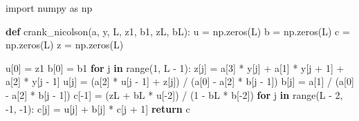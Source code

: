 \documentclass[
  letterpaper,
  DIV=11,
  numbers=noendperiod]{scrartcl}
\newenvironment{Shaded}{\begin{snugshade}}{\end{snugshade}}
\newcommand{\BuiltInTok}[1]{\textcolor[rgb]{0.00,0.23,0.31}{#1}}
\newcommand{\ControlFlowTok}[1]{\textcolor[rgb]{0.00,0.23,0.31}{\textbf{#1}}}
\newcommand{\DecValTok}[1]{\textcolor[rgb]{0.68,0.00,0.00}{#1}}
\newcommand{\ImportTok}[1]{\textcolor[rgb]{0.00,0.46,0.62}{#1}}
\newcommand{\KeywordTok}[1]{\textcolor[rgb]{0.00,0.23,0.31}{\textbf{#1}}}
\newcommand{\NormalTok}[1]{\textcolor[rgb]{0.00,0.23,0.31}{#1}}
\newcommand{\OperatorTok}[1]{\textcolor[rgb]{0.37,0.37,0.37}{#1}}
\theoremstyle{definition}
\theoremstyle{remark}
\begin{document}
\label{crank_nicolson}
\begin{Shaded}
\begin{Highlighting}[]
\ImportTok{import}\NormalTok{ numpy }\ImportTok{as}\NormalTok{ np}

\KeywordTok{def}\NormalTok{ crank\_nicolson(a, y, L, z1, b1, zL, bL):}
\NormalTok{    u }\OperatorTok{=}\NormalTok{ np.zeros(L)}
\NormalTok{    b }\OperatorTok{=}\NormalTok{ np.zeros(L)}
\NormalTok{    c }\OperatorTok{=}\NormalTok{ np.zeros(L)}
\NormalTok{    z }\OperatorTok{=}\NormalTok{ np.zeros(L)}

\NormalTok{    u[}\DecValTok{0}\NormalTok{] }\OperatorTok{=}\NormalTok{ z1}
\NormalTok{    b[}\DecValTok{0}\NormalTok{] }\OperatorTok{=}\NormalTok{ b1}
    \ControlFlowTok{for}\NormalTok{ j }\KeywordTok{in} \BuiltInTok{range}\NormalTok{(}\DecValTok{1}\NormalTok{, L }\OperatorTok{{-}} \DecValTok{1}\NormalTok{):}
\NormalTok{        z[j] }\OperatorTok{=}\NormalTok{ a[}\DecValTok{3}\NormalTok{] }\OperatorTok{*}\NormalTok{ y[j] }\OperatorTok{+}\NormalTok{ a[}\DecValTok{1}\NormalTok{] }\OperatorTok{*}\NormalTok{ y[j }\OperatorTok{+} \DecValTok{1}\NormalTok{] }\OperatorTok{+}\NormalTok{ a[}\DecValTok{2}\NormalTok{] }\OperatorTok{*}\NormalTok{ y[j }\OperatorTok{{-}} \DecValTok{1}\NormalTok{]}
\NormalTok{        u[j] }\OperatorTok{=}\NormalTok{ (a[}\DecValTok{2}\NormalTok{] }\OperatorTok{*}\NormalTok{ u[j }\OperatorTok{{-}} \DecValTok{1}\NormalTok{] }\OperatorTok{+}\NormalTok{ z[j]) }\OperatorTok{/}\NormalTok{ (a[}\DecValTok{0}\NormalTok{] }\OperatorTok{{-}}\NormalTok{ a[}\DecValTok{2}\NormalTok{] }\OperatorTok{*}\NormalTok{ b[j }\OperatorTok{{-}} \DecValTok{1}\NormalTok{])}
\NormalTok{        b[j] }\OperatorTok{=}\NormalTok{ a[}\DecValTok{1}\NormalTok{] }\OperatorTok{/}\NormalTok{ (a[}\DecValTok{0}\NormalTok{] }\OperatorTok{{-}}\NormalTok{ a[}\DecValTok{2}\NormalTok{] }\OperatorTok{*}\NormalTok{ b[j }\OperatorTok{{-}} \DecValTok{1}\NormalTok{])}
\NormalTok{    c[}\OperatorTok{{-}}\DecValTok{1}\NormalTok{] }\OperatorTok{=}\NormalTok{ (zL }\OperatorTok{+}\NormalTok{ bL }\OperatorTok{*}\NormalTok{ u[}\OperatorTok{{-}}\DecValTok{2}\NormalTok{]) }\OperatorTok{/}\NormalTok{ (}\DecValTok{1} \OperatorTok{{-}}\NormalTok{ bL }\OperatorTok{*}\NormalTok{ b[}\OperatorTok{{-}}\DecValTok{2}\NormalTok{])}
    \ControlFlowTok{for}\NormalTok{ j }\KeywordTok{in} \BuiltInTok{range}\NormalTok{(L }\OperatorTok{{-}} \DecValTok{2}\NormalTok{, }\OperatorTok{{-}}\DecValTok{1}\NormalTok{, }\OperatorTok{{-}}\DecValTok{1}\NormalTok{):}
\NormalTok{        c[j] }\OperatorTok{=}\NormalTok{ u[j] }\OperatorTok{+}\NormalTok{ b[j] }\OperatorTok{*}\NormalTok{ c[j }\OperatorTok{+} \DecValTok{1}\NormalTok{]}
    \ControlFlowTok{return}\NormalTok{ c}


\end{Highlighting}
\end{Shaded}
\end{document}
